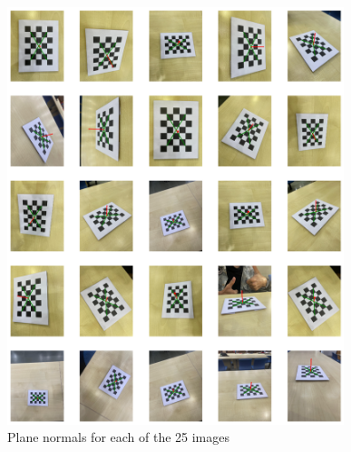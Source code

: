 \documentclass[10pt]{article}
\begin{document}
\begin{enumerate}
        \begin{figure}[htbp]
            \begin{center}
                \includegraphics[width=0.875\textwidth]{Assets/Question-4/normals.png}
                \caption{Plane normals for each of the 25 images}
                \label{fig:normals}
            \end{center}
        \end{figure}
    \end{enumerate}
    \pagebreak
\end{document}
